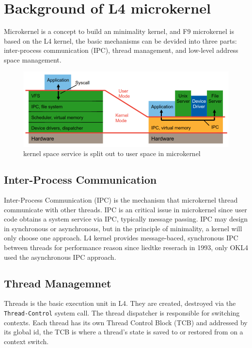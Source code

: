 \documentclass[10pt,preprint,nocopyrightspace]{sigplanconf}
\begin{document}
\section{Background of L4 microkernel}

Microkernel is a concept to build an minimality kernel, and F9 microkernel is based on the L4 kernel, the basic mechanisms can be devided into three parts: inter-process communication (IPC), thread management, and low-level address space management.

\begin{figure}[H]
	\begin{center}
		\includegraphics[width=\linewidth]{picture/kernel_diff.png}
	\end{center}
	\caption{kernel space service is split out to user space in microkernel \cite{heiser2012}}
	\label{fig:kernel_diff}
\end{figure}


\subsection{Inter-Process Communication}

Inter-Process Communication (IPC) is the mechanism that microkernel thread communicate with other threads\cite{liedtke1993improving}. IPC is an critical issue in microkernel since user code obtains a system service via IPC, typically message passing. IPC may design in synchronous or asynchronous, but in the principle of minimality, a kernel will only choose one approach. L4 kernel provides message-baced, synchronous IPC between threads for performance reason since liedtke reserach in 1993\cite{liedtke1993improving}, only OKL4 used the asynchronous IPC approach\cite{elphinstone2013l3}.

\subsection{Thread Managemnet}

Threads is the basic execution unit in L4. They are created, destroyed via the \verb|Thread-Control| system call\cite{nourai2005aphysically}. The thread dispatcher is responsible for switching contexts. Each thread has its own Thread Control Block (TCB) and addressed by its global id, the TCB is where a thread's state is saved to or restored from on a context switch\cite{nourai2005aphysically}.
\end{document}
